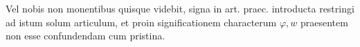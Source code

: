 \expandafter\def\csname HistoricalNoteText12\endcsname{Vel nobis non monentibus quisque videbit, signa in art. praec. introducta restringi ad istum
solum articulum, et proin significationem characterum $\varphi,w$ praesentem non esse confundendam cum pristina.}
